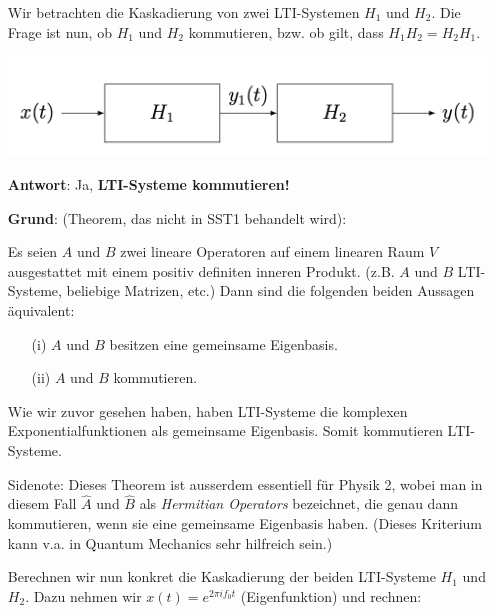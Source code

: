 \documentclass[11pt]{article}
\begin{document}
{\vspace*{-0.5cm}
\begin{itemize}[leftmargin=0pt]
    \item[] Wir betrachten die Kaskadierung von zwei LTI-Systemen $H_1$ und $H_2$. Die Frage ist nun, ob $H_1$ und $H_2$ kommutieren, bzw. ob gilt, dass $H_1H_2 = H_2 H_1$.
    \begin{center}
        \includegraphics[width=0.7\linewidth]{docimgs/Kaskadierung.png}
    \end{center}
    \item[] \textbf{Antwort}: Ja, \textbf{LTI-Systeme kommutieren!}
    \item[] \textbf{Grund}: (Theorem, das nicht in SST1 behandelt wird):
    \item[] Es seien $A$ und $B$ zwei lineare Operatoren auf einem linearen Raum $V$ ausgestattet mit einem positiv definiten inneren Produkt. (z.B. $A$ und $B$ LTI-Systeme, beliebige Matrizen, etc.) Dann sind die folgenden beiden Aussagen äquivalent: \begin{itemize}
        \item[(i)] $A$ und $B$ besitzen eine gemeinsame Eigenbasis.
        \item[(ii)] $A$ und $B$ kommutieren.
    \end{itemize}
    \item[] Wie wir zuvor gesehen haben, haben LTI-Systeme die komplexen Exponentialfunktionen als gemeinsame Eigenbasis. Somit kommutieren LTI-Systeme.
    \item[] Sidenote: Dieses Theorem ist ausserdem essentiell für Physik 2, wobei man in diesem Fall $\hat{A}$ und $\hat{B}$ als \textit{Hermitian Operators} bezeichnet, die genau dann kommutieren, wenn sie eine gemeinsame Eigenbasis haben. (Dieses Kriterium kann v.a. in Quantum Mechanics sehr hilfreich sein.)
    \item[] Berechnen wir nun konkret die Kaskadierung der beiden LTI-Systeme $H_1$ und $H_2$. Dazu nehmen wir $x(t) = e^{2 \pi i f_0 t}$ (Eigenfunktion) und rechnen:
    \item[] 
    \item[] %
\end{itemize}

}
\end{document}
